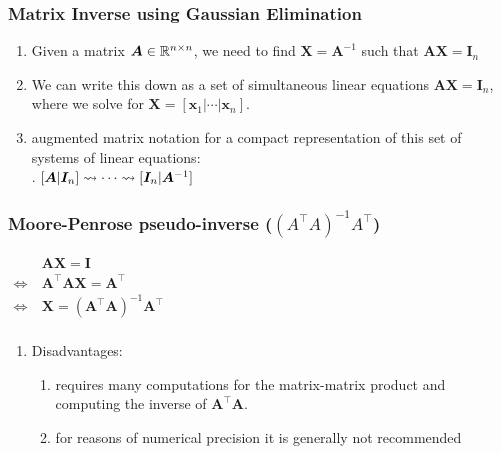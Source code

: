 \subsubsection{Matrix Inverse using Gaussian Elimination}

\begin{enumerate}
    \item Given a matrix $\bm{A} \in \mathbb{R}^{n\times n}$, we need to find $\bm{X} = \bm{A}^{-1}$ such that $\bm{A}\bm{X} = \bm{I}_n$
    \hfill \cite{mfml/book/mml/Deisenroth-Faisal-Ong}

    \item We can write this down as a set of simultaneous linear equations $\bm{A}\bm{X} = \bm{I}_n$, where we solve for $\bm{X} = [\bm{x}_1| \cdots |\bm{x}_n]$.
    \hfill \cite{mfml/book/mml/Deisenroth-Faisal-Ong}

    \item augmented matrix notation for a compact representation of this set of systems of linear equations:
    \hfill \cite{mfml/book/mml/Deisenroth-Faisal-Ong}
    \\
    .\hfill
    $
        [\bm{A}|\bm{I}_n]
        \mathrel{\leadsto} \cdots \mathrel{\leadsto}
        [\bm{I}_n|\bm{A}^{-1}]
    $
    \hfill \cite{mfml/book/mml/Deisenroth-Faisal-Ong}


\end{enumerate}




\subsubsection{Moore-Penrose pseudo-inverse ($({A}^\top {A})^{-1} {A}^\top$)}

$
    \begin{aligned}
                         & \bm{A}\bm{X} = \bm{I} \\
        \Leftrightarrow\ & \bm{A}^\top \bm{A}\bm{X} = \bm{A}^\top \\
        \Leftrightarrow\ & \bm{X} = (\bm{A}^\top \bm{A})^{-1} \bm{A}^\top \\
    \end{aligned}
$
\hfill \cite{mfml/book/mml/Deisenroth-Faisal-Ong}


\vspace{0.2cm}

\begin{enumerate}
    \item Disadvantages:
    \begin{enumerate}
        \item requires many computations for the matrix-matrix product and computing the inverse of $\bm{A}^\top \bm{A}$.
        \hfill \cite{mfml/book/mml/Deisenroth-Faisal-Ong}

        \item for reasons of numerical precision it is generally not recommended
        \hfill \cite{mfml/book/mml/Deisenroth-Faisal-Ong}
    \end{enumerate}
\end{enumerate}





